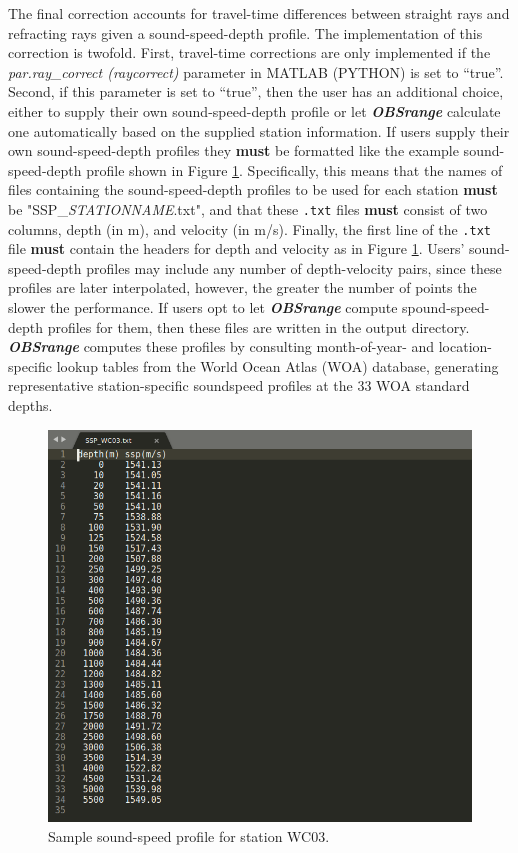 \documentclass[titlepage, 12pt]{article}
\begin{document}
   The final correction accounts for travel-time differences between straight rays and refracting rays given a sound-speed-depth profile. The implementation of this correction is twofold. First, travel-time corrections are only implemented if the \textit{par.ray\_correct (raycorrect)} parameter in MATLAB (PYTHON) is set to ``true''. Second, if this parameter is set to ``true'', then the user has an additional choice, either to supply their own sound-speed-depth profile or let \textbf{\textit{OBSrange}} calculate one automatically based on the supplied station information. If users supply their own sound-speed-depth profiles they \textbf{must} be formatted like the example sound-speed-depth profile shown in Figure \ref{fig:ssp}. Specifically, this means that the names of files containing the sound-speed-depth profiles to be used for each station \textbf{must} be "SSP\_\textit{STATIONNAME}.txt", and that these \texttt{.txt} files \textbf{must} consist of two columns, depth (in m), and velocity (in m/s). Finally, the first line of the \texttt{.txt} file \textbf{must} contain the headers for depth and velocity as in Figure \ref{fig:ssp}. Users' sound-speed-depth profiles may include any number of depth-velocity pairs, since these profiles are later interpolated, however, the greater the number of points the slower the performance. If users opt to let \textbf{\textit{OBSrange}} compute spound-speed-depth profiles for them, then these files are written in the output directory. \textbf{\textit{OBSrange}} computes these profiles by consulting month-of-year- and location-specific lookup tables from the World Ocean Atlas (WOA) database, generating representative station-specific soundspeed profiles at the 33 WOA standard depths. 

   \begin{figure}[!htb]
    \includegraphics[width=\linewidth]{ssp.png}
    \caption{Sample sound-speed profile for station WC03.}
    \label{fig:ssp}
   \end{figure}
\end{document}
